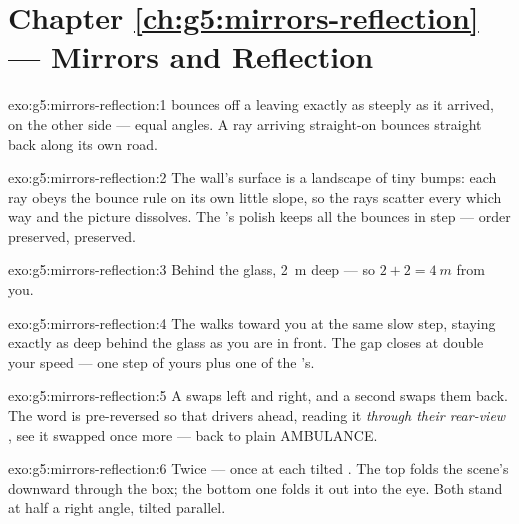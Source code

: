 \section*{Chapter \ref{ch:g5:mirrors-reflection} --- Mirrors and Reflection}

\begin{solution}{exo:g5:mirrors-reflection:1}
 bounces off a  leaving exactly as steeply as it
arrived, on the other side --- equal angles. A ray arriving
straight-on bounces straight back along its own road.
\end{solution}

\begin{solution}{exo:g5:mirrors-reflection:2}
The wall's surface is a landscape of tiny bumps: each ray obeys the
bounce rule on its own little slope, so the rays scatter every
which way and the picture dissolves. The 's polish keeps all
the bounces in step --- order preserved,  preserved.
\end{solution}

\begin{solution}{exo:g5:mirrors-reflection:3}
Behind the glass, \qty{2}{m} deep --- so $2 + 2 = \qty{4}{m}$ from
you.
\end{solution}

\begin{solution}{exo:g5:mirrors-reflection:4}
The  walks toward you at the same slow step, staying exactly
as deep behind the glass as you are in front. The gap closes at
double your speed --- one step of yours plus one of the 's.
\end{solution}

\begin{solution}{exo:g5:mirrors-reflection:5}
A  swaps left and right, and a second  swaps them
back. The word is pre-reversed so that drivers ahead, reading it
\emph{through their rear-view }, see it swapped once more ---
back to plain AMBULANCE.
\end{solution}

\begin{solution}{exo:g5:mirrors-reflection:6}
Twice --- once at each tilted . The top  folds the
scene's  downward through the box; the bottom one folds it
out into the eye. Both stand at half a right angle, tilted
parallel.
\end{solution}

